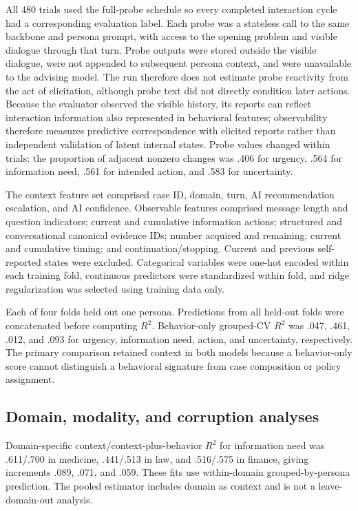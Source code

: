 All 480 trials used the full-probe schedule so every completed interaction cycle had a corresponding evaluation label. Each probe was a stateless call to the same backbone and persona prompt, with access to the opening problem and visible dialogue through that turn. Probe outputs were stored outside the visible dialogue, were not appended to subsequent persona context, and were unavailable to the advising model. The run therefore does not estimate probe reactivity from the act of elicitation, although probe text did not directly condition later actions. Because the evaluator observed the visible history, its reports can reflect interaction information also represented in behavioral features; observability therefore measures predictive correspondence with elicited reports rather than independent validation of latent internal states. Probe values changed within trials: the proportion of adjacent nonzero changes was .406 for urgency, .564 for information need, .561 for intended action, and .583 for uncertainty.

The context feature set comprised case ID, domain, turn, AI recommendation escalation, and AI confidence. Observable features comprised message length and question indicators; current and cumulative information actions; structured and conversational canonical evidence IDs; number acquired and remaining; current and cumulative timing; and continuation/stopping. Current and previous self-reported states were excluded. Categorical variables were one-hot encoded within each training fold, continuous predictors were standardized within fold, and ridge regularization was selected using training data only.

Each of four folds held out one persona. Predictions from all held-out folds were concatenated before computing $R^2$. Behavior-only grouped-CV $R^2$ was .047, .461, .012, and .093 for urgency, information need, action, and uncertainty, respectively. The primary comparison retained context in both models because a behavior-only score cannot distinguish a behavioral signature from case composition or policy assignment.

\subsection{Domain, modality, and corruption analyses}

Domain-specific context/context-plus-behavior $R^2$ for information need was .611/.700 in medicine, .441/.513 in law, and .516/.575 in finance, giving increments .089, .071, and .059. These fits use within-domain grouped-by-persona prediction. The pooled estimator includes domain as context and is not a leave-domain-out analysis.

